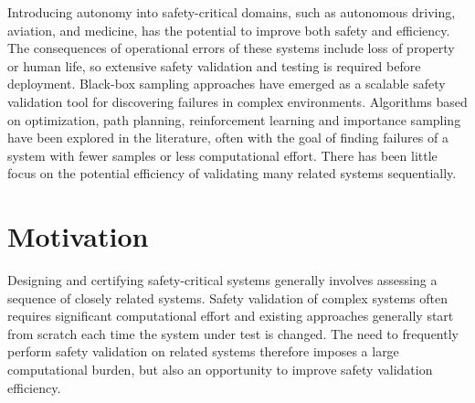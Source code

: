 Introducing autonomy into safety-critical domains, such as autonomous driving, aviation, and medicine, has the potential to improve both safety and efficiency. The consequences of operational errors of these systems include loss of property or human life, so extensive safety validation and testing is required before deployment. Black-box sampling approaches have emerged as a scalable safety validation tool for discovering failures in complex environments. Algorithms based on optimization, path planning, reinforcement learning and importance sampling have been explored in the literature, often with the goal of finding failures of a system with fewer samples or less computational effort. There has been little focus on the potential efficiency of validating many related systems sequentially. 


\section{Motivation}
Designing and certifying safety-critical systems generally involves assessing a sequence of closely related systems. Safety validation of complex systems often requires significant computational effort and existing approaches generally start from scratch each time the system under test is changed. The need to frequently perform safety validation on related systems therefore imposes a large computational burden, but also an opportunity to improve safety validation efficiency. 

